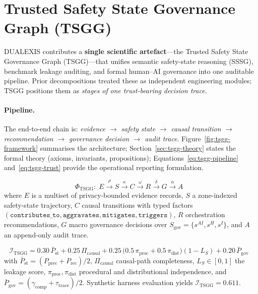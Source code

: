 \section{Trusted Safety State Governance Graph (TSGG)}
\label{sec:tsgg}

DUALEXIS contributes a \textbf{single scientific artefact}---the Trusted Safety State
Governance Graph (TSGG)---that unifies semantic safety-state reasoning (SSSG), benchmark
leakage auditing, and formal human--AI governance into one auditable pipeline. Prior
decompositions treated these as independent engineering modules; TSGG positions them as
\emph{stages of one trust-bearing decision trace}.

\paragraph{Pipeline.}
The end-to-end chain is:
\emph{evidence $\rightarrow$ safety state $\rightarrow$ causal transition $\rightarrow$ recommendation $\rightarrow$ governance decision $\rightarrow$ audit trace}.
Figure~\ref{fig:tsgg-framework} summarises the architecture; Section~\ref{sec:tsgg-theory}
states the formal theory (axioms, invariants, propositions); Equations~\eqref{eq:tsgg-pipeline}
and~\eqref{eq:tsgg-trust} provide the operational reporting formulation.




\begin{equation}
  \label{eq:tsgg-pipeline}
  \Phi_{\mathrm{TSGG}}:
  \; E \xrightarrow{\rho} S \xrightarrow{\kappa} C \xrightarrow{\omega} R
  \xrightarrow{\delta} G \xrightarrow{\alpha} A
\end{equation}
where $E$ is a multiset of privacy-bounded evidence records, $S$ a zone-indexed safety-state
trajectory, $C$ causal transitions with typed factors
$(\texttt{contributes\_to}, \texttt{aggravates}, \texttt{mitigates}, \texttt{triggers})$,
$R$ orchestration recommendations, $G$ macro governance decisions over
$S_{\mathrm{gov}}=\{s^{AI}, s^{H}, s^{I}\}$, and $A$ an append-only audit trace.

\begin{equation}
  \label{eq:tsgg-trust}
  \mathcal{I}_{\mathrm{TSGG}} =
  0.30\,\bar{P}_{\mathrm{st}} +
  0.25\,\Pi_{\mathrm{causal}} +
  0.25\,\bigl(0.5\,\pi_{\mathrm{proc}} + 0.5\,\pi_{\mathrm{dist}}\bigr)(1 - L_S) +
  0.20\,\bar{P}_{\mathrm{gov}}
\end{equation}
with $\bar{P}_{\mathrm{st}}=(P_{\mathrm{prec}}+P_{\mathrm{rec}})/2$,
$\Pi_{\mathrm{causal}}$ causal-path completeness, $L_S\in[0,1]$ the leakage score,
$\pi_{\mathrm{proc}},\pi_{\mathrm{dist}}$ procedural and distributional independence,
and $\bar{P}_{\mathrm{gov}}=(\gamma_{\mathrm{comp}}+\tau_{\mathrm{trace}})/2$.
Synthetic harness evaluation yields
$\mathcal{I}_{\mathrm{TSGG}}=0.611$.


